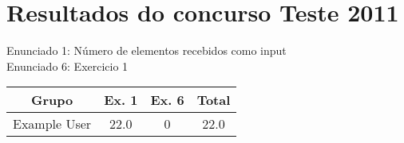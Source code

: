 \documentclass[12pt]{article}
\begin{document}
\begin{table}[ht]
\section{Resultados do concurso Teste 2011}Enunciado 1: Número de elementos recebidos como input\\ 
Enunciado 6:  Exercicio 1 \\ 

\begin{tabular}{|c | c | c | c| }
	\hline\hline
Grupo & Ex. 1  & Ex. 6 & Total \\ [0.5ex]
	\hline
Example User & 22.0 & 0 & 22.0 \\[1ex] 
	\hline
\end{tabular}
\label{table:nonlin}
\end{table}
\end{document}
